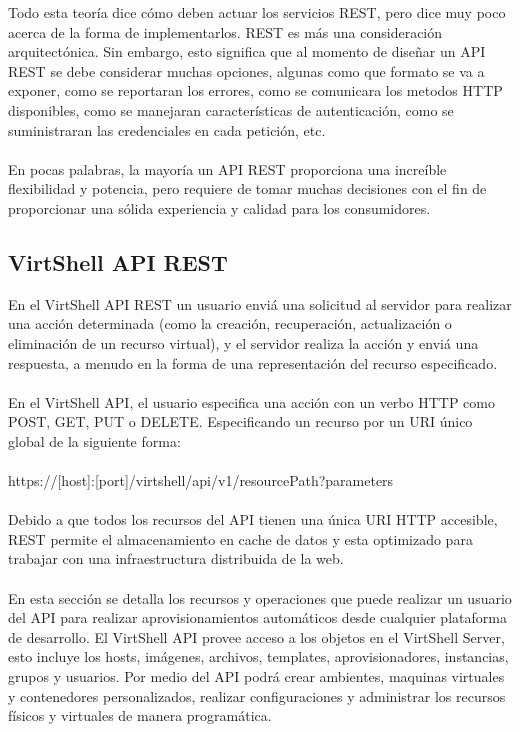 Todo esta teoría dice cómo deben actuar los servicios REST, pero dice muy poco acerca de la forma de implementarlos. REST es más una consideración arquitectónica. Sin embargo, esto significa que al momento de diseñar un API REST se debe considerar muchas opciones, algunas como que formato se va a exponer, como se reportaran los errores, como se comunicara los metodos HTTP disponibles, como se manejaran características de autenticación, como se suministraran las credenciales en cada petición, etc.\\
\\
En pocas palabras, la mayoría un API REST proporciona una increíble flexibilidad y potencia, pero requiere de tomar muchas decisiones con el fin de proporcionar una sólida experiencia y calidad para los consumidores.

\subsection{VirtShell API REST}
En el VirtShell API REST un usuario enviá una solicitud al servidor para realizar una acción determinada (como la creación, recuperación, actualización o eliminación de un recurso virtual), y el servidor realiza la acción y enviá una respuesta, a menudo en la forma de una representación del recurso especificado.\\
\\
En el VirtShell API, el usuario especifica una acción con un verbo HTTP como POST, GET, PUT o DELETE. Especificando un recurso por un URI único global de la siguiente forma: \\
\\
https://[host]:[port]/virtshell/api/v1/resourcePath?parameters\\
\\
Debido a que todos los recursos del API tienen una única URI HTTP accesible, REST permite el almacenamiento en cache de datos y esta optimizado para trabajar con una infraestructura distribuida de la web.\\
\\
En esta sección se detalla los recursos y operaciones que puede realizar un usuario del API para realizar aprovisionamientos automáticos desde cualquier plataforma de desarrollo. El VirtShell API provee acceso a los objetos en el VirtShell Server, esto incluye los hosts, imágenes, archivos, templates, aprovisionadores, instancias, grupos y usuarios. Por medio del API podrá crear ambientes, maquinas virtuales y contenedores personalizados, realizar configuraciones y administrar los recursos físicos y virtuales de manera programática. \\

